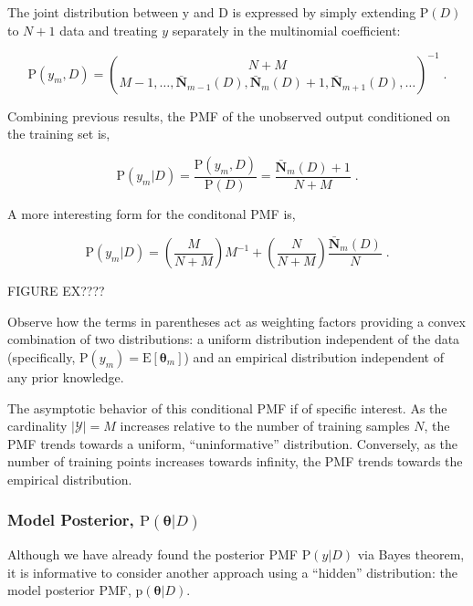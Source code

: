 \documentclass[12pt]{article}
\begin{document}
The joint distribution between $\mathrm{y}$ and $\mathrm{D}$ is expressed by simply extending $\text{P}(D)$ to $N+1$ data and treating $y$ separately in the multinomial coefficient:

\begin{equation}
\text{P}(y_m,D) = \binom{N+M}{M-1,\ldots,\bar{\bm{N}}_{m-1}(D),\bar{\bm{N}}_m(D)+1,\bar{\bm{N}}_{m+1}(D),\ldots}^{-1} \;.
\end{equation}

Combining previous results, the PMF of the unobserved output conditioned on the training set is,

\begin{equation} \label{P_y_D_basic}
\text{P}(y_m | D) = \frac{\text{P}(y_m,D)}{\text{P}(D)} = \frac{\bar{\bm{N}}_m(D)+1}{N+M} \;.
\end{equation}

A more interesting form for the conditonal PMF is,

\begin{equation} \label{P_y_D}
\text{P}(y_m | D) = \left(\frac{M}{N+M}\right) M^{-1} + \left(\frac{N}{N+M}\right) \frac{\bar{\bm{N}}_m(D)}{N} \;.
\end{equation}

FIGURE EX????

Observe how the terms in parentheses act as weighting factors providing a convex combination of two distributions: a uniform distribution independent of the data (specifically, $\text{P}(y_m) = \text{E}[\bm{\theta}_m]$) and an empirical distribution independent of any prior knowledge.

The asymptotic behavior of this conditional PMF if of specific interest. As the cardinality $|\mathcal{Y}| = M$ increases relative to the number of training samples $N$, the PMF trends towards a uniform, ``uninformative'' distribution. Conversely, as the number of training points increases towards infinity, the PMF trends towards the empirical distribution. 






\subsubsection{Model Posterior, $\text{P}(\bm{\theta} | D)$}

Although we have already found the posterior PMF $\text{P}(y | D)$ via Bayes theorem, it is informative to consider another approach using a ``hidden'' distribution: the model posterior PMF, $\text{p}(\bm{\theta} | D)$. 
\end{document}
